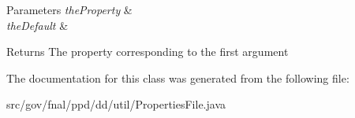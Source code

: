 \begin{DoxyParams}{Parameters}
{\em the\-Property} & \\
\hline
{\em the\-Default} & \\
\hline
\end{DoxyParams}
\begin{DoxyReturn}{Returns}
The property corresponding to the first argument 
\end{DoxyReturn}


The documentation for this class was generated from the following file\-:\begin{DoxyCompactItemize}
\item 
src/gov/fnal/ppd/dd/util/Properties\-File.\-java\end{DoxyCompactItemize}
